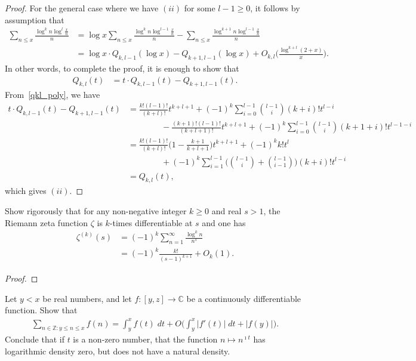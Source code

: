\documentclass[11pt]{article}
\newenvironment{ex}[1]
  {\renewcommand\theinnercustomthm{#1}\innercustomthm}
  {\endinnercustomthm}
\begin{document}
\begin{proof}
For the general case where we have $(ii)$ for some $l-1\geq 0$, it follows by assumption that
\begin{align*}
\sum_{n\leq x}\frac{\log^k{n}\log^l{\frac{x}{n}}}{n} &= \log{x}\sum_{n\leq x}\frac{\log^k{n}\log^{l-1}{\frac{x}{n}}}{n} -\sum_{n\leq x}\frac{\log^{k+1}{n}\log^{l-1}{\frac{x}{n}}}{n}\\
&= \log{x}\cdot Q_{k,l-1}(\log{x})-Q_{k+1,l-1}(\log{x})+O_{k,l}\bigg(\frac{\log^{k+l}(2+x)}{x}\bigg).
\end{align*}
In other words, to complete the proof, it is enough to show that
\begin{align*}
Q_{k,l}(t) &= t\cdot Q_{k,l-1}(t)-Q_{k+1,l-1}(t).
\end{align*}
From~\eqref{qkl_poly}, we have
\begin{align*}
t\cdot Q_{k,l-1}(t)-Q_{k+1,l-1}(t) &= \frac{k!(l-1)!}{(k+l)!}t^{k+l+1}+(-1)^k\sum_{i=0}^{l-1}\binom{l-1}{i}(k+i)!t^{l-i}\\
& \qquad\qquad -\frac{(k+1)!(l-1)!}{(k+l+1)!}t^{k+l+1}+(-1)^k\sum_{i=0}^{l-1}\binom{l-1}{i}(k+1+i)!t^{l-1-i}\\
&= \frac{k!(l-1)!}{(k+l)!}\bigg(1-\frac{k+1}{k+l+1}\bigg)t^{k+l+1}+(-1)^kk!t^l\\
& \qquad\qquad +(-1)^k\sum_{i=1}^{l-1}\bigg(\binom{l-1}{i}+\binom{l-1}{i-1}\bigg)(k+i)!t^{l-i}\\
&= Q_{k,l}(t),
\end{align*}
which gives $(ii)$.
\end{proof}

\begin{ex}{10}\label{ten}
Show rigorously that for any non-negative integer $k\geq 0$ and real $s>1$, the Riemann zeta function $\zeta$ is $k$-times differentiable at $s$ and one has
\begin{align*}
\zeta^{(k)}(s) &= (-1)^k\sum_{n=1}^\infty\frac{\log^k{n}}{n^s}\\
&= (-1)^k\frac{k!}{(s-1)^{k+1}}+O_k(1).
\end{align*}
\end{ex}

\begin{proof}
\phantom{a}
\end{proof}

\begin{ex}{11}\label{eleven}
Let $y<x$ be real numbers, and let $f:[y,z]\to\mathbb{C}$ be a continuously differentiable function. Show that
\begin{align*}
\sum_{n\in\mathbb{Z}:y\leq n\leq x}f(n)=\int_y^xf(t)\;dt+O\bigg(\int_y^x|f'(t)|\;dt+|f(y)|\bigg).
\end{align*}
Conclude that if $t$ is a non-zero number, that the function $n\mapsto n^{\imath t}$ has logarithmic density zero, but does not have a natural density.
\end{ex}
\end{document}
